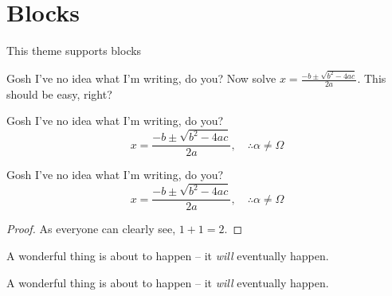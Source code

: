 \documentclass[aspectratio=1610]{beamer}
\begin{document}
\section{Blocks}


\begin{frame}[allowframebreaks]{This theme supports blocks}

    \begin{exampleblock}{Gosh I've no idea what I'm writing, do you?}
    Now solve $x = \frac{-b \pm \sqrt{b^2 -4ac}}{2a}$. This should be easy, right?
    \end{exampleblock}

    \begin{alertblock}{Gosh I've no idea what I'm writing, do you?}
    \[ x = \frac{-b \pm \sqrt{b^2 -4ac}}{2a}, \quad\therefore \alpha \neq \Omega \]
    \end{alertblock}

    \begin{block}{Gosh I've no idea what I'm writing, do you?}
    \[ x = \frac{-b \pm \sqrt{b^2 -4ac}}{2a}, \quad\therefore \alpha \neq \Omega \]
    \end{block}
    
    \begin{proof}
    As everyone can clearly see, $1+1=2$.
    \end{proof}

    \begin{theorem}
    A wonderful thing is about to happen -- it \emph{will} eventually happen.
    \end{theorem}
    
    \begin{definition}
    A wonderful thing is about to happen -- it \emph{will} eventually happen.
    \end{definition}
\end{frame}
\end{document}
